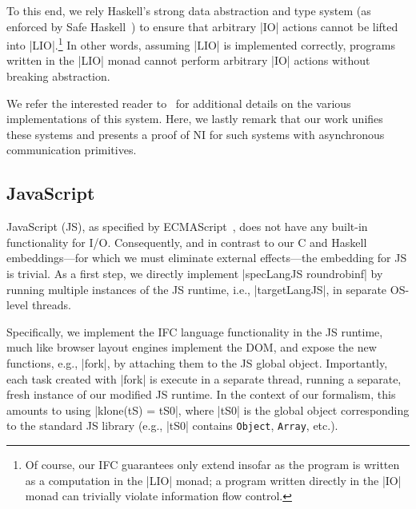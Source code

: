 To this end, we rely Haskell's strong data abstraction and type system
(as enforced by Safe Haskell~\cite{Terei:2012:SH:2364506.2364524}) to
ensure that arbitrary |IO| actions cannot be lifted into
|LIO|.\footnote{
Of course, our IFC guarantees only extend insofar as the program is
written as a computation in the |LIO| monad; a program written
directly in the |IO| monad can trivially violate information flow
control.
}
%
In other words, assuming |LIO| is implemented correctly, programs
written in the |LIO| monad cannot perform arbitrary |IO| actions
without breaking abstraction.
 
We refer the interested reader to~ for
additional details on the various implementations of this system.
%
Here, we lastly remark that our work unifies these systems and
presents a proof of NI for such systems with asynchronous
communication primitives.


\subsection{JavaScript}
\label{sec:real:js}

JavaScript (JS), as specified by ECMAScript~\tocite{}, does not have any
built-in functionality for I/O.
%
Consequently, and in contrast to our C and Haskell embeddings---for
which we must eliminate external effects---the embedding for JS is
trivial.
%
As a first step, we directly implement |specLangJS roundrobinf| by
running multiple instances of the JS runtime, i.e., |targetLangJS|, in
separate OS-level threads.

Specifically, we implement the IFC language functionality in the JS
runtime, much like browser layout engines implement the DOM, and
expose the new functions, e.g., |fork|, by attaching them to the JS
global object.
%
Importantly, each task created with |fork| is execute in a separate
thread, running a separate, fresh instance of our modified JS runtime.
%
In the context of our formalism, this amounts to using |klone(tS) =
tS0|, where |tS0| is the global object corresponding to the standard
JS library (e.g., |tS0| contains \texttt{Object}, \texttt{Array},
etc.).

